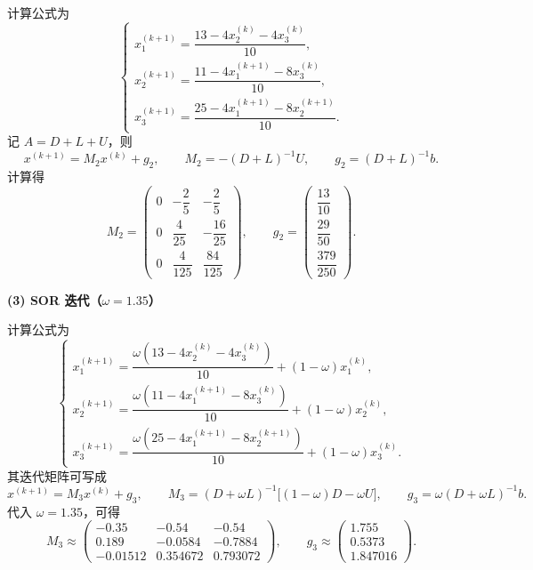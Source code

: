 \documentclass[11pt, a4paper]{ctexart}
\begin{document}
\begin{solution}
    计算公式为
    \[
        \begin{cases}
            x_1^{(k+1)} = \dfrac{13 - 4x_2^{(k)} - 4x_3^{(k)}}{10}, \\
            x_2^{(k+1)} = \dfrac{11 - 4x_1^{(k+1)} - 8x_3^{(k)}}{10}, \\
            x_3^{(k+1)} = \dfrac{25 - 4x_1^{(k+1)} - 8x_2^{(k+1)}}{10}.
        \end{cases}
    \]
    记 $A = D + L + U$，则
    \[
        x^{(k+1)} = M_2 x^{(k)} + g_2,
        \qquad
        M_2 = -(D+L)^{-1}U,
        \qquad
        g_2 = (D+L)^{-1}b.
    \]
    计算得
    \[
        M_2
        =
        \begin{pmatrix}
            0 & -\dfrac{2}{5} & -\dfrac{2}{5} \\
            0 & \dfrac{4}{25} & -\dfrac{16}{25} \\
            0 & \dfrac{4}{125} & \dfrac{84}{125}
        \end{pmatrix},
        \qquad
        g_2
        =
        \begin{pmatrix}
            \dfrac{13}{10} \\
            \dfrac{29}{50} \\
            \dfrac{379}{250}
        \end{pmatrix}.
    \]

    \textbf{(3) SOR 迭代（$\omega = 1.35$）}

    计算公式为
    \[
        \begin{cases}
            x_1^{(k+1)}
            =
            \dfrac{\omega(13 - 4x_2^{(k)} - 4x_3^{(k)})}{10}
            + (1-\omega)x_1^{(k)}, \\
            x_2^{(k+1)}
            =
            \dfrac{\omega(11 - 4x_1^{(k+1)} - 8x_3^{(k)})}{10}
            + (1-\omega)x_2^{(k)}, \\
            x_3^{(k+1)}
            =
            \dfrac{\omega(25 - 4x_1^{(k+1)} - 8x_2^{(k+1)})}{10}
            + (1-\omega)x_3^{(k)}.
        \end{cases}
    \]
    其迭代矩阵可写成
    \[
        x^{(k+1)} = M_3 x^{(k)} + g_3,
        \qquad
        M_3 = (D+\omega L)^{-1}\bigl[(1-\omega)D-\omega U\bigr],
        \qquad
        g_3 = \omega (D+\omega L)^{-1}b.
    \]
    代入 $\omega = 1.35$，可得
    \[
        M_3
        \approx
        \begin{pmatrix}
            -0.35 & -0.54 & -0.54 \\
            0.189 & -0.0584 & -0.7884 \\
            -0.01512 & 0.354672 & 0.793072
        \end{pmatrix},
        \qquad
        g_3
        \approx
        \begin{pmatrix}
            1.755 \\
            0.5373 \\
            1.847016
        \end{pmatrix}.
    \]


\end{solution}
\end{document}
